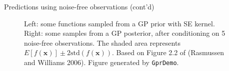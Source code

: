 \documentclass[10pt,mathserif]{beamer}
\begin{document}
\begin{frame}{Predictions using noise-free observations (cont'd)}
\begin{figure}
\centering
{}
\caption{Left: some functions sampled from a GP prior with SE kernel. Right: some samples from a GP posterior, after conditioning on 5 noise-free observations. The shaded area represents $E [f(\bm{x})]\pm2\text{std}(f(\bm{x}))$. Based on Figure 2.2 of (Rasmussen and Williams 2006). Figure generated by \texttt{GprDemo}.}
\end{figure}
\end{frame}
\end{document}
